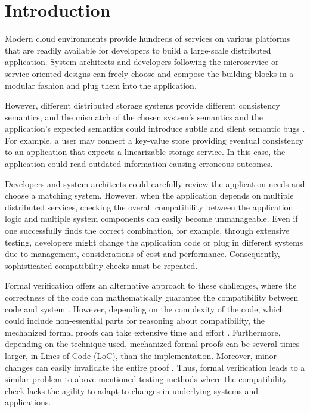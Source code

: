 \section{Introduction}

Modern cloud environments provide hundreds of services on various platforms
that are readily available for developers to build a
large-scale distributed application. System architects and developers
following the
microservice or service-oriented designs can freely
choose and compose the building blocks in a modular fashion and plug them
into the application.

However, different distributed storage systems provide different consistency
semantics, and the mismatch of the chosen system's semantics and the
application's expected semantics could introduce subtle and silent
semantic bugs \cite{silentbugs}. For example, a user may connect a
key-value store providing
eventual consistency to an application that expects a
linearizable storage service. In this case, the application could
read outdated information causing erroneous outcomes.

Developers and system architects could carefully review the
application needs and choose a
matching system. However, when the application depends on multiple
distributed services, checking the overall compatibility between the
application logic and multiple system components can easily become unmanageable. Even
if one successfully finds the correct combination, for example, through
extensive testing, developers might change the application code or
plug in different systems due to management, considerations of cost and performance.
Consequently, sophisticated compatibility checks must be repeated.


Formal verification offers an alternative approach to these challenges,
where the correctness of the code can mathematically guarantee the
compatibility between code and system \cite{lampson2021hints}.
However, depending on
the complexity of the code, which could include non-essential parts
for reasoning about compatibility, the mechanized formal proofs
can take extensive time and effort \cite{certikos-osdi16,
klein2009sel4, wormspace}.
Furthermore, depending on the technique used, mechanized formal
proofs can be several times larger, in Lines of Code (LoC), than the implementation.
Moreover, minor changes can easily invalidate the entire proof
\cite{klein2009sel4}.
Thus, formal verification
leads to a similar problem to above-mentioned testing methods where
the compatibility check
lacks the agility to adapt to changes in underlying systems and
applications.

